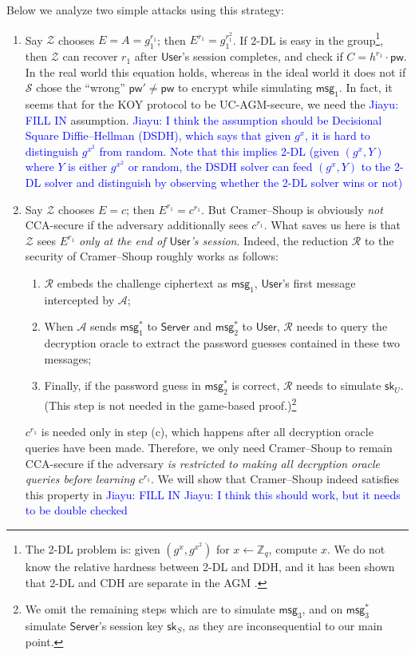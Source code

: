 \documentclass[12pt,a4paper]{article}
\newcommand{\simulator}{\mathcal{S}}
\newcommand{\env}{\mathcal{Z}}
\newcommand{\adv}{\mathcal{A}}
\newcommand{\red}{\mathcal{R}}
\newcommand{\user}{\mathsf{User}}
\newcommand{\sk}{\mathsf{sk}}
\newcommand{\pw}{\mathsf{pw}}
\newcommand{\server}{\mathsf{Server}}
\newcommand{\msg}[1]{\mathsf{msg}_{#1}}
\def\xjy#1{\textcolor{blue}{Jiayu: #1}}
\begin{document}
Below we analyze two simple attacks using this strategy:
\begin{enumerate}
  \item Say $\env$ chooses $E = A = g_1^{r_1}$; then $E^{r_1} = g_1^{r_1^2}$. If 2-DL is easy in the group\footnote{The 2-DL problem is: given $(g^x,g^{x^2})$ for $x \gets \mathbb{Z}_q$, compute $x$. We do not know the relative hardness between 2-DL and DDH, and it has been shown that 2-DL and CDH are separate in the   AGM \cite{C:BauFucLos20}.}, then $\env$ can recover $r_1$ after $\user$'s session completes, and check if $C = h^{r_1} \cdot \pw$. In the real world this equation holds, whereas in the ideal world it does not if $\simulator$ chose the ``wrong'' $\pw' \neq \pw$ to encrypt while simulating $\msg{1}$. In fact, it seems that for the KOY protocol to be UC-AGM-secure, we need the \xjy{FILL IN} assumption. \xjy{I think the assumption should be Decisional Square Diffie--Hellman (DSDH), which says that given $g^x$, it is hard to distinguish $g^{x^2}$ from random. Note that this implies 2-DL (given $(g^x,Y)$ where $Y$ is either $g^{x^2}$ or random, the DSDH solver can feed $(g^x,Y)$ to the 2-DL solver and distinguish by observing whether the 2-DL solver wins or not)}
  \item Say $\env$ chooses $E = c$; then $E^{r_1} = c^{r_1}$. But Cramer--Shoup is obviously \emph{not} CCA-secure if the adversary additionally sees $c^{r_1}$. What saves us here is that $\env$ sees $E^{r_1}$ \emph{only at the end of $\user$'s session}. Indeed, the reduction $\red$ to the security of Cramer--Shoup roughly works as follows:
      \begin{enumerate}
        \item $\red$ embeds the challenge ciphertext as $\msg{1}$, $\user$'s first message intercepted by $\adv$;
        \item When $\adv$ sends $\msg{1}^*$ to $\server$ and $\msg{2}^*$ to $\user$, $\red$ needs to query the decryption oracle to extract the password guesses contained in these two messages;
        \item Finally, if the password guess in $\msg{2}^*$ is correct, $\red$ needs to simulate $\sk_U$. (This step is not needed in the game-based proof.)\footnote{We omit the remaining steps which are to simulate $\msg{3}$, and on $\msg{3}^*$ simulate $\server$'s session key $\sk_S$, as they are inconsequential to our main point.}
      \end{enumerate}
      $c^{r_1}$ is needed only in step (c), which happens after all decryption oracle queries have been made. Therefore, we only need Cramer--Shoup to remain CCA-secure if the adversary \emph{is restricted to making all decryption oracle queries before learning $c^{r_1}$}. We will show that Cramer--Shoup indeed satisfies this property in \xjy{FILL IN} \xjy{I think this should work, but it needs to be double checked}
\end{enumerate}
\end{document}
